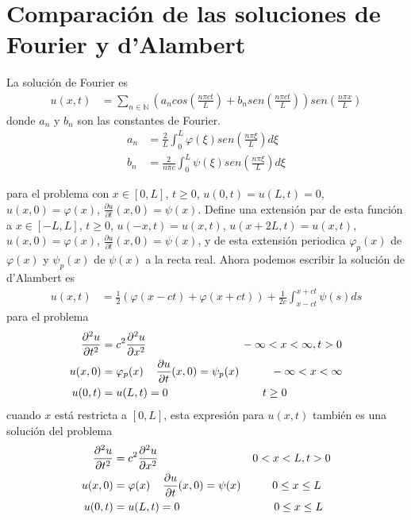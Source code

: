 \documentclass[11pt]{book}
\theoremstyle{plain}
\theoremstyle{definition}
\newcommand{\N}{\mathbb{N}}
\begin{document}
\section{Comparación de las soluciones de Fourier y d'Alambert}
La solución de Fourier es
\begin{align*}
    u(x,t) &= \sum_{n\in\N} \left(a_{n}cos\left(\frac{n\pi ct}{L}\right) + b_{n}sen\left(\frac{n\pi ct}{L}\right)\right)sen(\frac{n\pi x}{L})
\end{align*}
donde $a_{n}$ y $b_{n}$ son las constantes de Fourier.
\begin{align*}
    a_{n} &= \frac{2}{L}\int_{0}^{L} \varphi(\xi)sen(\frac{n\pi \xi}{L})d\xi\\
    b_{n} &= \frac{2}{n\pi c}\int_{0}^{L} \psi(\xi)sen(\frac{n\pi \xi}{L})d\xi
\end{align*}

para el problema con $x\in[0,L]$, $t\geq 0$, $u(0,t) = u(L,t) = 0$, $u(x,0) = \varphi(x)$, $\frac{\partial u}{\partial t}(x,0) = \psi(x)$. Define una extensión par de esta función a $x\in[-L,L]$, $t\geq 0$, $u(-x,t) = u(x,t)$, $u(x+2L,t) = u(x,t)$, $u(x,0) = \varphi(x)$, $\frac{\partial u}{\partial t}(x,0) = \psi(x)$, y de esta extensión periodica $\varphi_{p}(x)$ de $\varphi(x)$ y $\psi_{p}(x)$ de $\psi(x)$ a la recta real. Ahora podemos escribir la solución de d'Alambert es
\begin{align*}
    u(x,t) &= \frac{1}{2}\left( \varphi(x - ct) +  \varphi(x + ct) \right) + \frac{1}{2c} \int_{x-ct}^{x+ct} \psi(s)ds    
\end{align*}
para el problema
\begin{align*}
    \frac{\partial^2 u}{\partial t^2} &= c^2 \frac{\partial^2 u}{\partial x^2} \hspace{30mm} -\infty<x<\infty, t > 0\\ 
    u(x,0)&= \varphi_p(x) \hspace{4mm} \frac{\partial u}{\partial t}(x,0) = \psi_p(x)  \hspace{10mm} -\infty<x<\infty\\
    u(0,t)&= u(L,t) = 0  \hspace{30mm} t\geq 0
\end{align*}
cuando $x$ está restricta a $[0,L]$, esta expresión para $u(x,t)$ también es una solución del problema
\begin{align*}
    \frac{\partial^2 u}{\partial t^2} &= c^2 \frac{\partial^2 u}{\partial x^2} \hspace{30mm} 0<x<L, t > 0\\ 
    u(x,0)&= \varphi(x) \hspace{4mm} \frac{\partial u}{\partial t}(x,0) = \psi(x)  \hspace{10mm} 0\leq x\leq L\\
    u(0,t)&= u(L,t) = 0  \hspace{30mm} 0\leq x\leq L
\end{align*}
\end{document}
